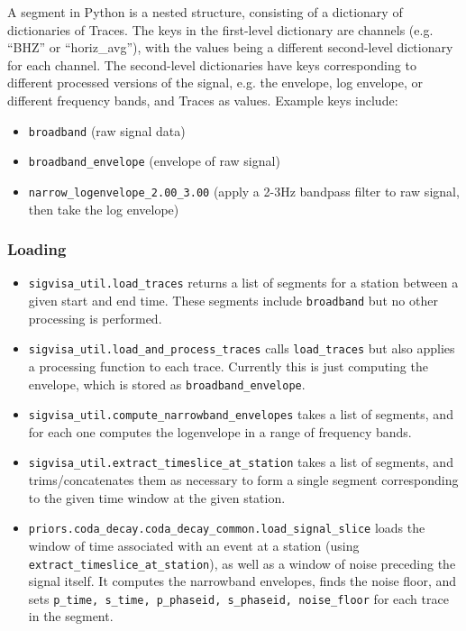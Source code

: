 \documentclass{article}
\begin{document}
A segment in Python is a nested structure, consisting of a dictionary of dictionaries of Traces. The keys in the first-level dictionary are channels (e.g. ``BHZ'' or ``horiz\_avg''), with the values being a different second-level dictionary for each channel. The second-level dictionaries have keys corresponding to different processed versions of the signal, e.g. the envelope, log envelope, or different frequency bands, and Traces as values. Example keys include:

\begin{itemize} 
\item {\tt broadband} (raw signal data)
\item {\tt broadband\_envelope} (envelope of raw signal)
\item {\tt narrow\_logenvelope\_2.00\_3.00} (apply a 2-3Hz bandpass filter to raw signal, then take the log envelope)
\end{itemize}

\subsubsection{Loading}
\begin{itemize}
\item {\tt sigvisa\_util.load\_traces} returns a list of segments for a station between a given start and end time. These segments include {\tt broadband} but no other processing is performed. 
\item {\tt sigvisa\_util.load\_and\_process\_traces} calls {\tt load\_traces} but also applies a processing function to each trace. Currently this is just computing the envelope, which is stored as {\tt broadband\_envelope}.
\item {\tt sigvisa\_util.compute\_narrowband\_envelopes} takes a list of segments, and for each one computes the logenvelope in a range of frequency bands. 
\item {\tt sigvisa\_util.extract\_timeslice\_at\_station} takes a list of segments, and trims/concatenates them as necessary to form a single segment corresponding to the given time window at the given station. 
\item {\tt priors.coda\_decay.coda\_decay\_common.load\_signal\_slice} loads the window of time associated with an event at a station (using {\tt extract\_timeslice\_at\_station}), as well as a window of noise preceding the signal itself. It computes the narrowband envelopes, finds the noise floor, and sets {\tt p\_time, s\_time, p\_phaseid, s\_phaseid, noise\_floor} for each trace in the segment.
\end{itemize}
\end{document}
